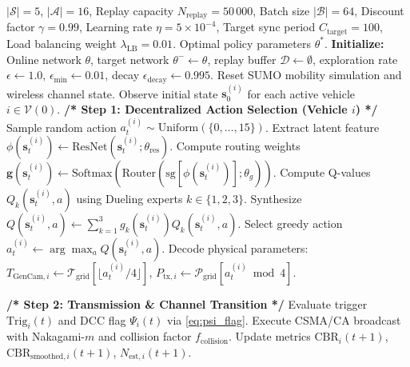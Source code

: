 \documentclass[journal]{IEEEtran}
\begin{document}
\begin{algorithm}[t]
\caption{Decentralized REMO-DQN Training and Online Inference}
\label{alg:remo_dqn}
\begin{algorithmic}[1]
\REQUIRE $|\mathcal{S}|=5$, $|\mathcal{A}|=16$, Replay capacity $N_{\text{replay}}=50\,000$, Batch size $|\mathcal{B}|=64$, Discount factor $\gamma=0.99$, Learning rate $\eta=5\times 10^{-4}$, Target sync period $C_{\text{target}}=100$, Load balancing weight $\lambda_{\text{LB}}=0.01$.
\ENSURE Optimal policy parameters $\theta^*$.
\STATE \textbf{Initialize:} Online network $\theta$, target network $\theta^- \leftarrow \theta$, replay buffer $\mathcal{D} \leftarrow \emptyset$, exploration rate $\epsilon \leftarrow 1.0$, $\epsilon_{\min} \leftarrow 0.01$, decay $\epsilon_{\text{decay}} \leftarrow 0.995$.
    \STATE Reset SUMO mobility simulation and wireless channel state.
    \STATE Observe initial state $\mathbf{s}_0^{(i)}$ for each active vehicle $i \in \mathcal{V}(0)$.
        \STATE \textbf{/* Step 1: Decentralized Action Selection (Vehicle $i$) */}
            \STATE Sample random action $a_t^{(i)} \sim \text{Uniform}(\{0, \dots, 15\})$.
        \ELSE
            \STATE Extract latent feature $\phi(\mathbf{s}_t^{(i)}) \leftarrow \text{ResNet}(\mathbf{s}_t^{(i)}; \theta_{\text{res}})$.
            \STATE Compute routing weights $\mathbf{g}(\mathbf{s}_t^{(i)}) \leftarrow \text{Softmax}(\text{Router}(\text{sg}[\phi(\mathbf{s}_t^{(i)})]; \theta_g))$.
            \STATE Compute Q-values $Q_k(\mathbf{s}_t^{(i)}, a)$ using Dueling experts $k \in \{1, 2, 3\}$.
            \STATE Synthesize $Q(\mathbf{s}_t^{(i)}, a) \leftarrow \sum_{k=1}^3 g_k(\mathbf{s}_t^{(i)}) Q_k(\mathbf{s}_t^{(i)}, a)$.
            \STATE Select greedy action $a_t^{(i)} \leftarrow \arg\max_a Q(\mathbf{s}_t^{(i)}, a)$.
        \ENDIF
        \STATE Decode physical parameters: $T_{\text{GenCam}, i} \leftarrow \mathcal{T}_{\text{grid}}[\lfloor a_t^{(i)}/4 \rfloor]$, $P_{\text{tx}, i} \leftarrow \mathcal{P}_{\text{grid}}[a_t^{(i)} \bmod 4]$.
        
        \STATE \textbf{/* Step 2: Transmission \& Channel Transition */}
        \STATE Evaluate trigger $\text{Trig}_i(t)$ and DCC flag $\Psi_i(t)$ via \eqref{eq:psi_flag}.
        \STATE Execute CSMA/CA broadcast with Nakagami-$m$ and collision factor $f_{\text{collision}}$.
        \STATE Update metrics $\text{CBR}_i(t+1)$, $\text{CBR}_{\text{smoothed}, i}(t+1)$, $N_{\text{est}, i}(t+1)$.
        

\end{algorithmic}
\end{algorithm}
\end{document}

